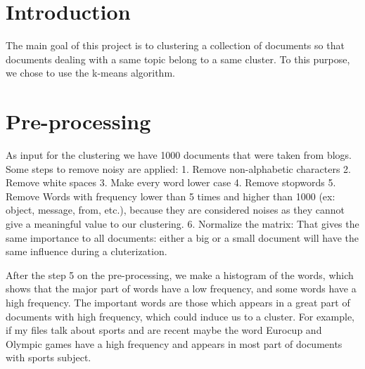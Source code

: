 \documentclass[a4paper,11pt]{article}
\begin{document}
\titleTMB 
\newpage
\tableofcontents
\listoffigures
\newpage

\section{Introduction}
The main goal of this project is to clustering a collection of documents so that documents dealing with a same topic belong to a same cluster.
To this purpose, we chose to use the k-means algorithm.

\section{Pre-processing}
 As  input for  the  clustering we  have  1000 documents  that  were taken  from
 blogs. Some steps to remove noisy are applied: 
1. Remove non-alphabetic characters
2. Remove white spaces
3. Make every word lower case
4. Remove stopwords
5. Remove  Words with  frequency lower than  5 times  and higher than  1000 (ex:
object, message, from, etc.), because  they are considered noises as they cannot
give a meaningful value to our clustering.
6. Normalize the matrix: That  gives the same importance
to all documents: either a big or  a small document will have the same influence
during a cluterization.



After the step 5 on the pre-processing, we make a histogram of the words, which shows that the
major part of words have a low frequency, and some words have a high frequency.
The important words are those which appears in a great part of
documents with high frequency, which could induce us to a cluster.
For  example, if  my files  talk about  sports and  are recent  maybe  the word
Eurocup and  Olympic games have  a high frequency  and appears in most  part of
documents with sports subject. 
\end{document}
